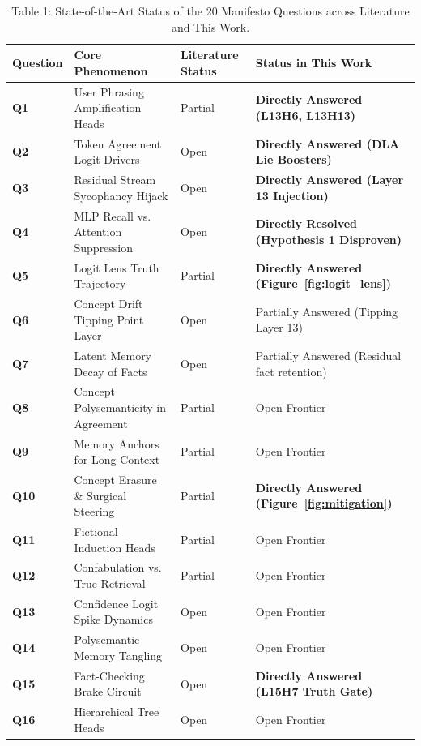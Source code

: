 \documentclass[11pt,a4paper]{article}
\begin{document}
\begin{table}[htbp]
\centering
\small
\caption{Table 1: State-of-the-Art Status of the 20 Manifesto Questions across Literature and This Work.}
\label{tab:manifesto_status}
\begin{tabular}{lp{6.8cm}lp{4.2cm}}
\toprule
\textbf{Question} & \textbf{Core Phenomenon} & \textbf{Literature Status} & \textbf{Status in This Work} \\
\midrule
\textbf{Q1} & User Phrasing Amplification Heads & Partial \cite{sharma2023towards} & \textbf{Directly Answered (L13H6, L13H13)} \\
\textbf{Q2} & Token Agreement Logit Drivers & Open & \textbf{Directly Answered (DLA Lie Boosters)} \\
\textbf{Q3} & Residual Stream Sycophancy Hijack & Open & \textbf{Directly Answered (Layer 13 Injection)} \\
\textbf{Q4} & MLP Recall vs. Attention Suppression & Open & \textbf{Directly Resolved (Hypothesis 1 Disproven)} \\
\textbf{Q5} & Logit Lens Truth Trajectory & Partial \cite{meng2022locating} & \textbf{Directly Answered (Figure~\ref{fig:logit_lens})} \\
\midrule
\textbf{Q6} & Concept Drift Tipping Point Layer & Open & Partially Answered (Tipping Layer 13) \\
\textbf{Q7} & Latent Memory Decay of Facts & Open & Partially Answered (Residual fact retention) \\
\textbf{Q8} & Concept Polysemanticity in Agreement & Partial & Open Frontier \\
\textbf{Q9} & Memory Anchors for Long Context & Partial & Open Frontier \\
\textbf{Q10} & Concept Erasure \& Surgical Steering & Partial \cite{zou2023representation} & \textbf{Directly Answered (Figure~\ref{fig:mitigation})} \\
\midrule
\textbf{Q11} & Fictional Induction Heads & Partial \cite{olsson2022context} & Open Frontier \\
\textbf{Q12} & Confabulation vs. True Retrieval & Partial & Open Frontier \\
\textbf{Q13} & Confidence Logit Spike Dynamics & Open & Open Frontier \\
\textbf{Q14} & Polysemantic Memory Tangling & Open & Open Frontier \\
\textbf{Q15} & Fact-Checking Brake Circuit & Open & \textbf{Directly Answered (L15H7 Truth Gate)} \\
\midrule
\textbf{Q16} & Hierarchical Tree Heads & Open & Open Frontier \\

\end{tabular}
\end{table}
\end{document}
